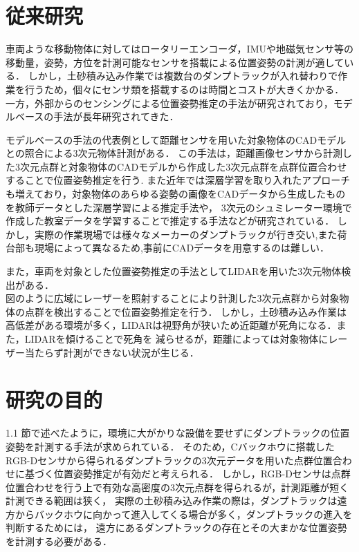 \newpage

\section{従来研究}
車両ような移動物体に対してはロータリーエンコーダ，IMUや地磁気センサ等の移動量，姿勢，方位を計測可能なセンサを搭載による位置姿勢の計測が適している．
しかし，土砂積み込み作業では複数台のダンプトラックが入れ替わりで作業を行うため，個々にセンサ類を搭載するのは時間とコストが大きくかかる．
一方，外部からのセンシングによる位置姿勢推定の手法が研究されており，モデルベースの手法が長年研究されてきた\cite{中原智治2001}\cite{西卓郎2014}．
\par
モデルベースの手法の代表例として距離センサを用いた対象物体のCADモデルとの照合による3次元物体計測がある\cite{林2008}．
この手法は，距離画像センサから計測した3次元点群と対象物体のCADモデルから作成した3次元点群を点群位置合わせすることで位置姿勢推定を行う.
また近年では深層学習を取り入れたアプローチも増えており，対象物体のあらゆる姿勢の画像をCADデータから生成したものを教師データとした深層学習による推定手法\cite{Sundermeyer2018}や，
3次元のシュミレーター環境で作成した教室データを学習することで推定する手法\cite{Tremblay2018}などが研究されている．
しかし，実際の作業現場では様々なメーカーのダンプトラックが行き交い,また荷台部も現場によって異なるため,事前にCADデータを用意するのは難しい．

また，車両を対象とした位置姿勢推定の手法としてLIDARを用いた3次元物体検出がある．\cite{Zhang2017}\cite{Chen2017}\cite{Lang2019}\\
図のように広域にレーザーを照射することにより計測した3次元点群から対象物体の点群を検出することで位置姿勢推定を行う．
しかし，土砂積み込み作業は高低差がある環境が多く，LIDARは視野角が狭いため近距離が死角になる．また，LIDARを傾けることで死角を
減らせるが，距離によっては対象物体にレーザー当たらず計測ができない状況が生じる．

\newpage
\section{研究の目的}
1.1 節で述べたように，環境に大がかりな設備を要せずにダンプトラックの位置姿勢を計測する手法が求められている．
そのため，Cバックホウに搭載したRGB-Dセンサから得られるダンプトラックの3次元データを用いた点群位置合わせに基づく位置姿勢推定が有効だと考えられる．
しかし，RGB-Dセンサは点群位置合わせを行う上で有効な高密度の3次元点群を得られるが，計測距離が短く計測できる範囲は狭く，
実際の土砂積み込み作業の際は，ダンプトラックは遠方からバックホウに向かって進入してくる場合が多く，ダンプトラックの進入を判断するためには，
遠方にあるダンプトラックの存在とその大まかな位置姿勢を計測する必要がある．



